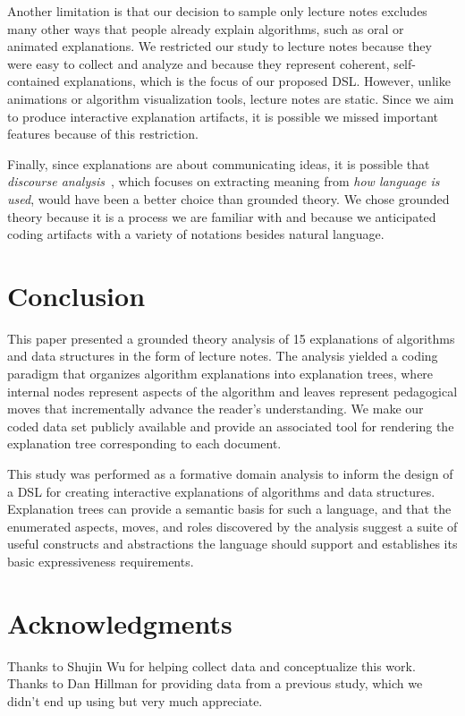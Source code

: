 \documentclass[sigconf]{acmart}
\begin{document}
Another limitation is that our decision to sample only lecture notes excludes
many other ways that people already explain algorithms, such as oral or
animated explanations. We restricted our study to lecture notes because they
were easy to collect and analyze and because they represent coherent,
self-contained explanations, which is the focus of our proposed DSL. However,
unlike animations or algorithm visualization tools, lecture notes are static.
Since we aim to produce interactive explanation artifacts, it is possible we
missed important features because of this restriction.


Finally, since explanations are about communicating ideas, it is possible that
\emph{discourse analysis}~\cite{Gee14}, which focuses on extracting meaning
from \emph{how language is used}, would have been a better choice than grounded
theory. We chose grounded theory because it is a process we are familiar with
and because we anticipated coding artifacts with a variety of notations besides
natural language.



\section{Conclusion}
\label{sec:conc}

This paper presented a grounded theory analysis of 15 explanations of
algorithms and data structures in the form of lecture notes.
%
The analysis yielded a coding paradigm that organizes algorithm explanations
into explanation trees, where internal nodes represent aspects of the algorithm
and leaves represent pedagogical moves that incrementally advance the reader's
understanding.
%
We make our coded data set publicly available and provide an associated tool
for rendering the explanation tree corresponding to each document.


This study was performed as a formative domain analysis to inform the design of
a DSL for creating interactive explanations of algorithms and data structures.
Explanation trees can provide a semantic basis for such a language, and that
the enumerated aspects, moves, and roles discovered by the analysis suggest a
suite of useful constructs and abstractions the language should support and
establishes its basic expressiveness requirements.


\section*{Acknowledgments}

Thanks to Shujin Wu for helping collect data and conceptualize this work.
%
Thanks to Dan Hillman for providing data from a previous study, which we didn't
end up using but very much appreciate.




\end{document}
